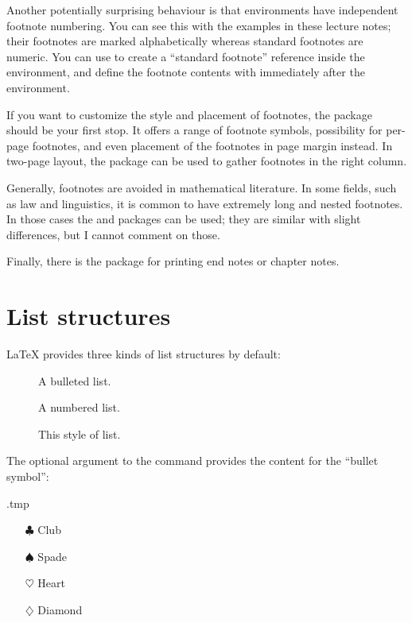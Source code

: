 Another potentially surprising behaviour is that  environments
have independent footnote numbering.
You can see this with the examples in these lecture notes;
their footnotes are marked alphabetically whereas standard footnotes are numeric.
You can use  to create a ``standard footnote'' reference inside the environment,
and define the footnote contents with  immediately after the environment.

If you want to customize the style and placement of footnotes,
the  package should be your first stop.
It offers a range of footnote symbols, possibility for per-page footnotes,
and even placement of the footnotes in page margin instead.
In two-page layout, the  package can be used to gather
footnotes in the right column.

Generally, footnotes are avoided in mathematical literature.
In some fields, such as law and linguistics,
it is common to have extremely long and nested footnotes.
In those cases the  and  packages can be used;
they are similar with slight differences, but I cannot comment on those.

Finally, there is the  package for printing end notes or chapter notes.


%
%
%
\section{List structures}\label{sec:lists}

\LaTeX{} provides three kinds of list structures by default:
\begin{description}
\item[] A bulleted list.
\item[] A numbered list.
\item[] This style of list.
\end{description}

The optional argument to the  command provides the content for the ``bullet symbol'':
%
\begin{VerbatimOut}{\jobname.tmp}
\begin{itemize}
\item[$\clubsuit$] Club
\item[$\spadesuit$] Spade
\item[$\heartsuit$] Heart
\item[$\diamondsuit$] Diamond
\end{itemize}
\end{VerbatimOut}
\ShowExample


